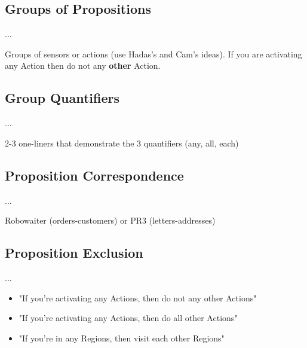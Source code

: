 \subsection{Groups of Propositions} 

...

\begin{myExample}\label{Ex:groups}
	Groups of sensors or actions (use Hadas's and Cam's ideas).
	If you are activating any Action then do not any \textbf{other} Action.
\end{myExample}

\subsection{Group Quantifiers} 

...

\begin{myExample}\label{Ex:quantifiers}
	2-3 one-liners that demonstrate the 3 quantifiers (any, all, each)
\end{myExample}

\subsection{Proposition Correspondence} 

...

\begin{myExample}\label{Ex:corresponding}
	Robowaiter (orders-customers) or PR3 (letters-addresses)
\end{myExample}

\subsection{Proposition Exclusion} 

...

\begin{myExample}\label{Ex:other}
	\begin{itemize}
		\item "If you're activating any Actions, then do not any other Actions"
		\item "If you're activating any Actions, then do all other Actions"
		\item "If you're in any Regions, then visit each other Regions"
	\end{itemize}
\end{myExample}